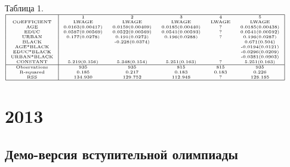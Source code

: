 \documentclass[addpoints, answers]{exam} %
\begin{document}
\begin{questions}
\begin{parts}
\end{parts}
Таблица 1.\\
$\begin{tiny}
\begin{tabular}{|c|ccccc|}
 \hline
 & 1 & 2 & 3 & 4 & 5\\
 COEFFICIENT & LWAGE & LWAGE & LWAGE & LWAGE & LWAGE\\
 AGE & 0.0163(0.00417) & 0.0159(0.00409) & 0.0185(0.00440) & ? & 0.0185(0.00438)\\
 EDUC & 0.0587(0.00569) & 0.0522(0.00569) & 0.0541(0.00593) & ? & 0.0541(0.00592)\\
 URBAN & 0.177(0.0278) & 0.191(0.0273) & 0.196(0.0288) & ? & 0.196(0.0287)\\
 BLACK & & -0.228(0.0374) & & & 0.671(0.504)\\
 AGE*BLACK & & & & & -0.0194(0.0121)  \\
 EDUC*BLACK & & & & & -0.0296(0.0209)\\
 URBAN*BLACK & & & & & -0.0381(0.0903)\\
 CONSTANT & 5.219(0.156) & 5.348(0.154) & 5.251(0.163) & ? & 5.251(0.163)\\
 \hline
 Observations & 935 & 935 & 815 & 815 & 935\\
 R-squared & 0.185 & 0.217 & 0.183 & 0.183 & 0.226\\
 RSS & 134.930 & 129.752 & 112.948& ? & 128.185\\
 \hline
\end{tabular}
\end{tiny}$
\end{questions}

\section{2013}

\subsection{Демо-версия вступительной олимпиады}
\end{document}
